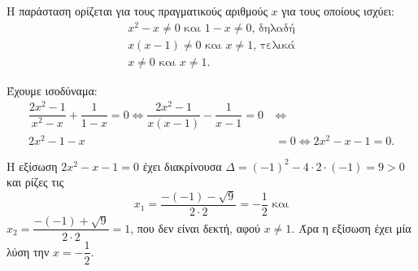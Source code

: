 
\begin{alist}
\item Η παράσταση ορίζεται για τους πραγματικούς αριθμούς $x$ για τους οποίους ισχύει:
\begin{gather*}
x^2 - x \ne 0 \text{ και } 1 - x \ne 0\text{, δηλαδή} \\
x(x - 1) \ne 0 \text{ και } x \ne 1\text{, τελικά} \\
x \ne 0 \text{ και } x \ne 1.
\end{gather*}

\item Έχουμε ισοδύναμα:
\begin{align*}
\dfrac{2x^2 - 1}{x^2 - x} + \dfrac{1}{1 - x} = 0 \Leftrightarrow \dfrac{2x^2 - 1}{x(x - 1)} - \dfrac{1}{x - 1} = 0 \ &\Leftrightarrow \\
2x^2 - 1 - x &= 0 \Leftrightarrow 2x^2 - x - 1 = 0.
\end{align*}

Η εξίσωση $2x^2 - x - 1 = 0$ έχει διακρίνουσα $\Delta = (-1)^2 - 4 \cdot 2 \cdot (-1) = 9 > 0$ και ρίζες τις
\[x_1 = \dfrac{-(-1) - \sqrt{9}}{2 \cdot 2} = -\dfrac{1}{2}\text{ και}\]
$x_2 = \dfrac{-(-1) + \sqrt{9}}{2 \cdot 2} = 1$, που δεν είναι δεκτή, αφού $x \ne 1$.
Άρα η εξίσωση έχει μία λύση την $x = -\dfrac{1}{2}$.
\end{alist}

